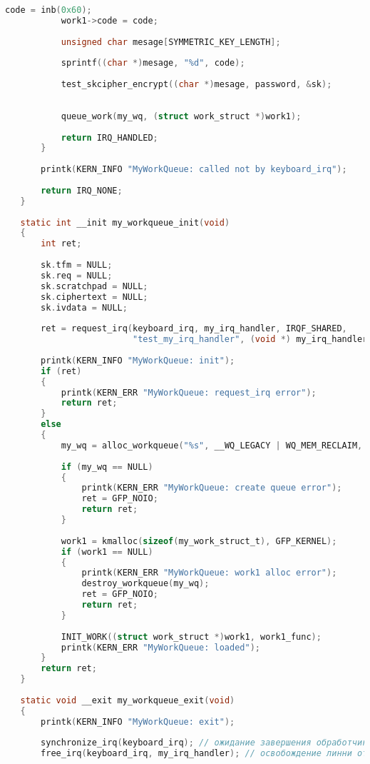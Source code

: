 \begin{lstlisting}[language=c, label=rudakov-menya-ne-spaset, caption=Загружаемый модуль ядра]
           code = inb(0x60);
           work1->code = code;
   
           unsigned char mesage[SYMMETRIC_KEY_LENGTH];
   
           sprintf((char *)mesage, "%d", code);
           
           test_skcipher_encrypt((char *)mesage, password, &sk);
   
   
           queue_work(my_wq, (struct work_struct *)work1);
   
           return IRQ_HANDLED;
       }
   
       printk(KERN_INFO "MyWorkQueue: called not by keyboard_irq");
   
       return IRQ_NONE;
   }
   
   static int __init my_workqueue_init(void)
   {
       int ret;
       
       sk.tfm = NULL;
       sk.req = NULL;
       sk.scratchpad = NULL;
       sk.ciphertext = NULL;
       sk.ivdata = NULL;
   
       ret = request_irq(keyboard_irq, my_irq_handler, IRQF_SHARED,
                         "test_my_irq_handler", (void *) my_irq_handler);
   
       printk(KERN_INFO "MyWorkQueue: init");
       if (ret)
       {
           printk(KERN_ERR "MyWorkQueue: request_irq error");
           return ret;
       }
       else
       {
           my_wq = alloc_workqueue("%s", __WQ_LEGACY | WQ_MEM_RECLAIM, 1, "my_wq");
   
           if (my_wq == NULL)
           {
               printk(KERN_ERR "MyWorkQueue: create queue error");
               ret = GFP_NOIO;
               return ret;
           }
   
           work1 = kmalloc(sizeof(my_work_struct_t), GFP_KERNEL);
           if (work1 == NULL)
           {
               printk(KERN_ERR "MyWorkQueue: work1 alloc error");
               destroy_workqueue(my_wq);
               ret = GFP_NOIO;
               return ret;
           }
   
           INIT_WORK((struct work_struct *)work1, work1_func);
           printk(KERN_ERR "MyWorkQueue: loaded");
       }
       return ret;
   }
   
   static void __exit my_workqueue_exit(void)
   {
       printk(KERN_INFO "MyWorkQueue: exit");
   
       synchronize_irq(keyboard_irq); // ожидание завершения обработчика
       free_irq(keyboard_irq, my_irq_handler); // освобождение линни от обработчика
   

\end{lstlisting}
